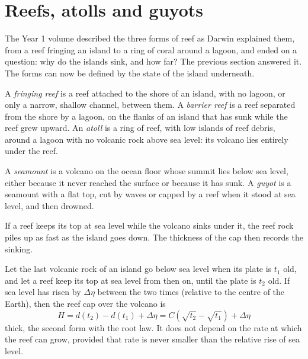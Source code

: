 \section{Reefs, atolls and guyots}\label{sec:b2:oceanic-islands:reefs}

The Year 1 volume described the three forms of reef as Darwin explained them, from a reef fringing
an island to a ring of coral around a lagoon, and ended on a question: why do the islands sink,
and how far? The previous section answered it. The forms can now be defined by the state of the
island underneath.

\begin{definition}\label{def:b2:oceanic-islands:reefs}
A \emph{fringing reef} is a reef attached to the shore of an island, with no
lagoon, or only a narrow, shallow channel, between them. A \emph{barrier reef}
is a reef separated from the shore by a lagoon, on the flanks of an island that has sunk while the
reef grew upward. An \emph{atoll} is a ring of reef, with low islands of reef debris,
around a lagoon with no volcanic rock above sea level: its volcano lies entirely under the reef.
\end{definition}

\begin{definition}\label{def:b2:oceanic-islands:seamount}
A \emph{seamount} is a volcano on the ocean floor whose summit lies below sea
level, either because it never reached the surface or because it has sunk. A
\emph{guyot} is a seamount with a flat top, cut by waves or capped by a reef when
it stood at sea level, and then drowned.
\end{definition}

If a reef keeps its top at sea level while the volcano sinks under it, the reef rock piles up as
fast as the island goes down. The thickness of the cap then records the sinking.

\begin{proposition}\label{prop:b2:oceanic-islands:cap}
Let the last volcanic rock of an island go below sea level when its plate is $t_1$ old, and let a
reef keep its top at sea level from then on, until the plate is $t_2$ old. If sea level has risen
by $\Delta\eta$ between the two times (relative to the centre of the Earth), then the reef cap
over the volcano is
\[
H = d(t_2) - d(t_1) + \Delta\eta = C\left(\sqrt{t_2} - \sqrt{t_1}\right) + \Delta\eta
\]
thick, the second form with the root law. It does not depend on the rate at which the reef can
grow, provided that rate is never smaller than the relative rise of sea level.
\end{proposition}

